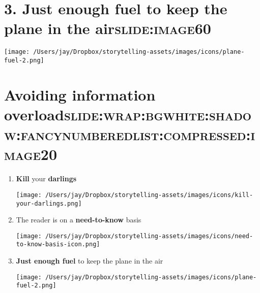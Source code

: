 \documentclass[12pt]{article}
\begin{document}
\section[3. Just enough fuel to keep the plane in the air]{3. Just enough fuel to keep the plane in the air\hfill{}\textsc{slide:image60}}
\label{sec:org7eb7539}
\begin{center}
\texttt{[image: /Users/jay/Dropbox/storytelling-assets/images/icons/plane-fuel-2.png]}
\end{center}

\section[Avoiding information \textbf{overload}]{Avoiding information \textbf{overload}\hfill{}\textsc{slide:wrap:bgwhite:shadow:fancynumberedlist:compressed:image20}}
\label{sec:org0b18d51}
\begin{enumerate}
\item \textbf{Kill} your \textbf{darlings} \begin{center}
\texttt{[image: /Users/jay/Dropbox/storytelling-assets/images/icons/kill-your-darlings.png]}
\end{center}
\item The reader is on a \textbf{need-to-know} basis \begin{center}
\texttt{[image: /Users/jay/Dropbox/storytelling-assets/images/icons/need-to-know-basis-icon.png]}
\end{center}
\item \textbf{Just enough fuel} to keep the plane in the air \begin{center}
\texttt{[image: /Users/jay/Dropbox/storytelling-assets/images/icons/plane-fuel-2.png]}
\end{center}
\end{enumerate}
\end{document}
